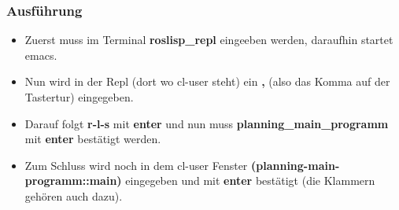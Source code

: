 \documentclass{suturo}
\begin{document}
\subsubsection{Ausführung}
\begin{itemize}

\item Zuerst muss im Terminal \textbf{roslisp\_repl} eingeeben werden, daraufhin startet emacs. 

\item Nun wird in der Repl (dort wo cl-user steht) ein \textbf{,} (also das Komma auf der Tastertur) eingegeben.

\item Darauf folgt \textbf{r-l-s} mit \textbf{enter} und nun muss \textbf{planning\_main\_programm} mit \textbf{enter} bestätigt werden.

\item Zum Schluss wird noch in dem cl-user Fenster \textbf{(planning-main-programm::main)} eingegeben und mit \textbf{enter} bestätigt (die Klammern gehören auch dazu).
\end{itemize}
\end{document}
